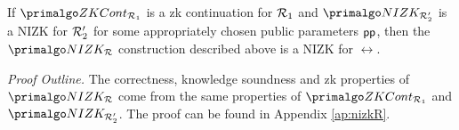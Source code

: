  
\begin{theorem}
	If $\ZKCont_{\relone}$ is a zk continuation for $\mathcal{R}_1$ and $\nizktwo$ is a NIZK for $\mathcal{R}_2'$ for some appropriately chosen public parameters $\mathsf{pp}$, 
	then the $\nizkR$ construction described above is a NIZK for $\rel$.
\end{theorem}

\textit{Proof Outline.} The correctness, knowledge soundness and zk properties of $ \nizkR $ come from the same properties of $ \ZKCont_{\relone} $ and $ \nizktwo $. The proof can be found in Appendix \ref{ap:nizkR}.
